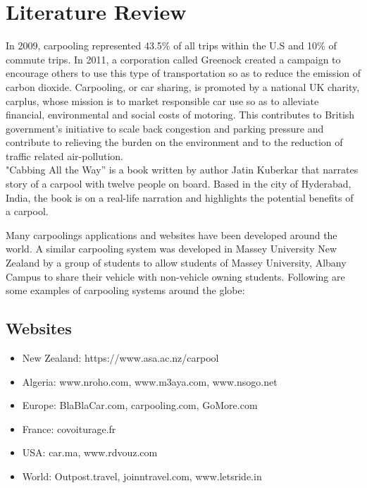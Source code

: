 \chapter{Literature Review} \label{chap:literatureReview}

\justify

In 2009, carpooling represented 43.5\% of all trips within the U.S and 10\% of commute trips. In 2011, a corporation called Greenock created a campaign to encourage others to use this type of transportation so as to reduce the emission of carbon dioxide. Carpooling, or car sharing, is promoted by a national UK charity, carplus, whose mission is to market responsible car use so as to alleviate ﬁnancial, environmental and social costs of motoring. This contributes to British government's initiative to scale back congestion and parking pressure and contribute to relieving the burden on the environment and to the reduction of traﬃc related air-pollution.\\

"Cabbing All the Way” is a book written by author Jatin Kuberkar that narrates story of a carpool with twelve people on board. Based in the city of Hyderabad, India, the book is on a real-life narration and highlights the potential beneﬁts of a carpool.

Many carpoolings applications and websites have been developed around the world. A similar carpooling system was developed in Massey University New Zealand by a group of students to allow students of Massey University, Albany Campus to share their vehicle with non-vehicle owning students. Following are some examples of carpooling systems around the globe: 

\section{Websites}
\begin{itemize}
	
	\item New Zealand: https://www.asa.ac.nz/carpool
	\item Algeria: www.nroho.com, www.m3aya.com, www.nsogo.net
	\item Europe: BlaBlaCar.com, carpooling.com, GoMore.com
	\item France: covoiturage.fr
	\item USA: car.ma, www.rdvouz.com
	\item World: Outpost.travel, joinntravel.com, www.letsride.in
	
\end{itemize}

